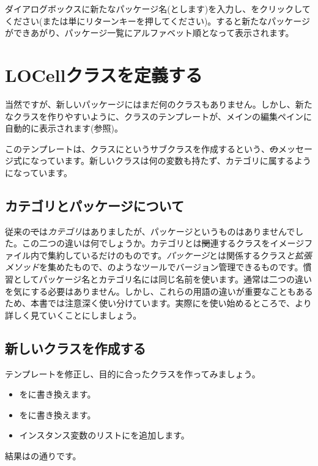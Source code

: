 \documentclass[a4paper,10pt,twoside]{book}
\begin{document}
ダイアログボックスに新たなパッケージ名(とします)を入力し、をクリックしてください(または単にリターンキーを押してください)。すると新たなパッケージができあがり、パッケージ一覧にアルファベット順となって表示されます。

\section{LOCellクラスを定義する}

当然ですが、新しいパッケージにはまだ何のクラスもありません。しかし、新たなクラスを作りやすいように、クラスのテンプレートが、メインの編集ペインに自動的に表示されます(参照)。

このテンプレートは、クラスにというサブクラスを作成するという、\st のメッセージ式になっています。新しいクラスは何の変数も持たず、カテゴリに属するようになっています。

\subsection{カテゴリとパッケージについて}

従来の\st では\emph{カテゴリ}はありましたが、パッケージというものはありませんでした。この二つの違いは何でしょうか。カテゴリとは\st 関連するクラスをイメージファイル内で集約しているだけのものです。\emph{パッケージ}とは関係するクラス\emph{と拡張メソッド}を集めたもので、のようなツールでバージョン管理できるものです。慣習としてパッケージ名とカテゴリ名には同じ名前を使います。通常は二つの違いを気にする必要はありません。しかし、これらの用語の違いが重要なこともあるため、本書では注意深く使い分けています。実際にを使い始めるところで、より詳しく見ていくことにしましょう。


\subsection{新しいクラスを作成する}

テンプレートを修正し、目的に合ったクラスを作ってみましょう。

\begin{itemize}
  \item {}をに書き換えます。
  \item {}をに書き換えます。
  \item インスタンス変数のリストにを追加します。
\end{itemize}
結果はの通りです。
\end{document}
